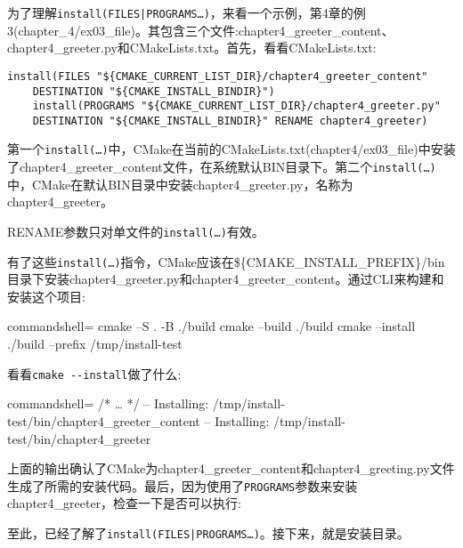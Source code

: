 为了理解\texttt{install(FILES|PROGRAMS…)}，来看一个示例，第4章的例3(chapter\_4/ex03\_file)。其包含三个文件:chapter4\_greeter\_content、chapter4\_greeter.py和CMakeLists.txt。首先，看看CMakeLists.txt:

\begin{lstlisting}[style=styleCMake]
install(FILES "${CMAKE_CURRENT_LIST_DIR}/chapter4_greeter_content"
	DESTINATION "${CMAKE_INSTALL_BINDIR}")
	install(PROGRAMS "${CMAKE_CURRENT_LIST_DIR}/chapter4_greeter.py"
	DESTINATION "${CMAKE_INSTALL_BINDIR}" RENAME chapter4_greeter)
\end{lstlisting}

第一个\texttt{install(…)}中，CMake在当前的CMakeLists.txt(chapter4/ex03\_file)中安装了chapter4\_greeter\_content文件，在系统默认BIN目录下。第二个\texttt{install(…)}中，CMake在默认BIN目录中安装chapter4\_greeter.py，名称为chapter4\_greeter。

\begin{tcolorbox}[colback=webgreen!5!white,colframe=webgreen!75!black,title=Note]
RENAME参数只对单文件的\texttt{install(…)}有效。
\end{tcolorbox}

有了这些\texttt{install(…)}指令，CMake应该在\$\{CMAKE\_INSTALL\_PREFIX\}/bin目录下安装chapter4\_greeter.py和chapter4\_greeter\_content。通过CLI来构建和安装这个项目:

\begin{tcblisting}{commandshell={}}
cmake –S . -B ./build
cmake --build ./build
cmake --install ./build --prefix /tmp/install-test
\end{tcblisting}

看看\texttt{cmake -{}-install}做了什么:

\begin{tcblisting}{commandshell={}}
/* … */
-- Installing: /tmp/install-test/bin/chapter4_greeter_content
-- Installing: /tmp/install-test/bin/chapter4_greeter
\end{tcblisting}

上面的输出确认了CMake为chapter4\_greeter\_content和chapter4\_greeting.py文件生成了所需的安装代码。最后，因为使用了\texttt{PROGRAMS}参数来安装chapter4\_greeter，检查一下是否可以执行:


至此，已经了解了\texttt{install(FILES|PROGRAMS…)}。接下来，就是安装目录。

